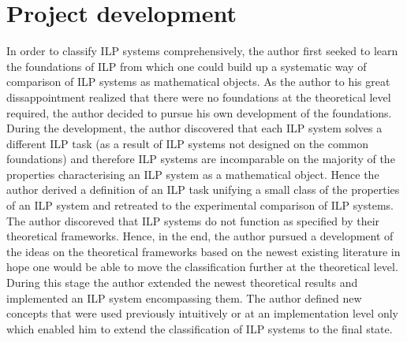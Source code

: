 \section{Project development}
In order to classify ILP systems comprehensively, the author first seeked to learn the foundations of ILP from which one could build up a systematic way of comparison of ILP systems as mathematical objects. As the author to his great dissappointment realized that there were no foundations at the theoretical level required, the author decided to pursue his own development of the foundations. During the development, the author discovered that each ILP system solves a different ILP task (as a result of ILP systems not designed on the common foundations) and therefore ILP systems are incomparable on the majority of the properties characterising an ILP system as a mathematical object. Hence the author derived a definition of an ILP task unifying a small class of the properties of an ILP system and retreated to the experimental comparison of ILP systems. The author discoreved that ILP systems do not function as specified by their theoretical frameworks. Hence, in the end, the author pursued a development of the ideas on the theoretical frameworks based on the newest existing literature in hope one would be able to move the classification further at the theoretical level. During this stage the author extended the newest theoretical results and implemented an ILP system encompassing them. The author defined new concepts that were used previously intuitively or at an implementation level only which enabled him to extend the classification of ILP systems to the final state.


